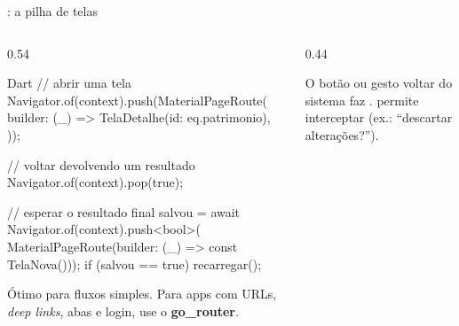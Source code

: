 \documentclass[aspectratio=169,10pt]{beamer}
\begin{document}
\begin{frame}[fragile]{: a pilha de telas}
  \begin{columns}[T]
    \begin{column}{0.54\textwidth}
\begin{codigo}[title=Navegação imperativa]{Dart}
// abrir uma tela
Navigator.of(context).push(MaterialPageRoute(
  builder: (_) => TelaDetalhe(id: eq.patrimonio),
));

// voltar devolvendo um resultado
Navigator.of(context).pop(true);

// esperar o resultado
final salvou = await Navigator.of(context).push<bool>(
    MaterialPageRoute(builder: (_) => const TelaNova()));
if (salvou == true) recarregar();
\end{codigo}
      \begin{dica}
        Ótimo para fluxos simples. Para apps com URLs, \emph{deep links}, abas e login, use o \textbf{go\_router}.
      \end{dica}
    \end{column}
    \begin{column}{0.44\textwidth}
      \centering
      \begin{conceito}
        O botão ou gesto voltar do sistema faz .  permite interceptar (ex.: ``descartar alterações?'').
      \end{conceito}
    \end{column}
  \end{columns}
\end{frame}
\end{document}
